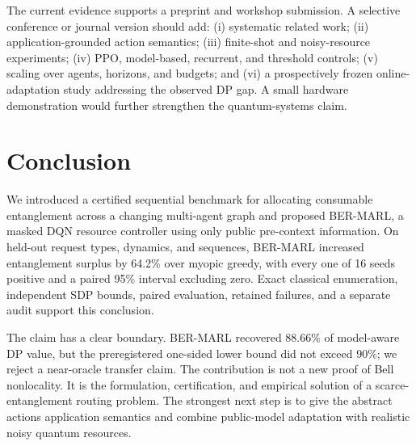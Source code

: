 \documentclass[10pt,twocolumn]{article}
\newcommand{\method}{\textsc{BER-MARL}}
\begin{document}
The current evidence supports a preprint and workshop submission. A selective conference or journal version should add: (i) systematic related work; (ii) application-grounded action semantics; (iii) finite-shot and noisy-resource experiments; (iv) PPO, model-based, recurrent, and threshold controls; (v) scaling over agents, horizons, and budgets; and (vi) a prospectively frozen online-adaptation study addressing the observed DP gap. A small hardware demonstration would further strengthen the quantum-systems claim.

\section{Conclusion}
We introduced a certified sequential benchmark for allocating consumable entanglement across a changing multi-agent graph and proposed \method, a masked DQN resource controller using only public pre-context information. On held-out request types, dynamics, and sequences, \method{} increased entanglement surplus by 64.2\% over myopic greedy, with every one of 16 seeds positive and a paired 95\% interval excluding zero. Exact classical enumeration, independent SDP bounds, paired evaluation, retained failures, and a separate audit support this conclusion.

The claim has a clear boundary. \method{} recovered 88.66\% of model-aware DP value, but the preregistered one-sided lower bound did not exceed 90\%; we reject a near-oracle transfer claim. The contribution is not a new proof of Bell nonlocality. It is the formulation, certification, and empirical solution of a scarce-entanglement routing problem. The strongest next step is to give the abstract actions application semantics and combine public-model adaptation with realistic noisy quantum resources.

\balance


\end{document}
